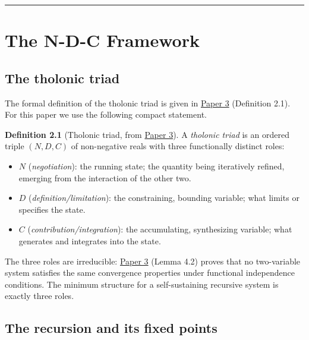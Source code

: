 \documentclass[12pt]{article}
\providecommand{\tightlist}{%
  \setlength{\itemsep}{0pt}\setlength{\parskip}{0pt}}
\begin{document}
\begin{center}\rule{0.5\linewidth}{0.5pt}\end{center}

\section{The N-D-C Framework}\label{the-n-d-c-framework}

\subsection{The tholonic triad}\label{the-tholonic-triad}

The formal definition of the tholonic triad is given in
\href{https://github.com/baardev/truevalue/blob/main/docnav/Research/papers/3_minimal-recursive-triadic-framework/3_minimal-recursive-triadic-framework.pdf}{Paper
3} (Definition 2.1). For this paper we use the following compact
statement.

\textbf{Definition 2.1} (Tholonic triad, from
\href{https://github.com/baardev/truevalue/blob/main/docnav/Research/papers/3_minimal-recursive-triadic-framework/3_minimal-recursive-triadic-framework.pdf}{Paper
3}). A \emph{tholonic triad} is an ordered triple \((N, D, C)\) of
non-negative reals with three functionally distinct roles:

\begin{itemize}
\tightlist
\item
  \(N\) (\emph{negotiation}): the running state; the quantity being
  iteratively refined, emerging from the interaction of the other two.
\item
  \(D\) (\emph{definition/limitation}): the constraining, bounding
  variable; what limits or specifies the state.
\item
  \(C\) (\emph{contribution/integration}): the accumulating,
  synthesizing variable; what generates and integrates into the state.
\end{itemize}

The three roles are irreducible:
\href{https://github.com/baardev/truevalue/blob/main/docnav/Research/papers/3_minimal-recursive-triadic-framework/3_minimal-recursive-triadic-framework.pdf}{Paper
3} (Lemma 4.2) proves that no two-variable system satisfies the same
convergence properties under functional independence conditions. The
minimum structure for a self-sustaining recursive system is exactly
three roles.

\subsection{The recursion and its fixed points}\label{the-recursion-and-its-fixed-points}
\end{document}

